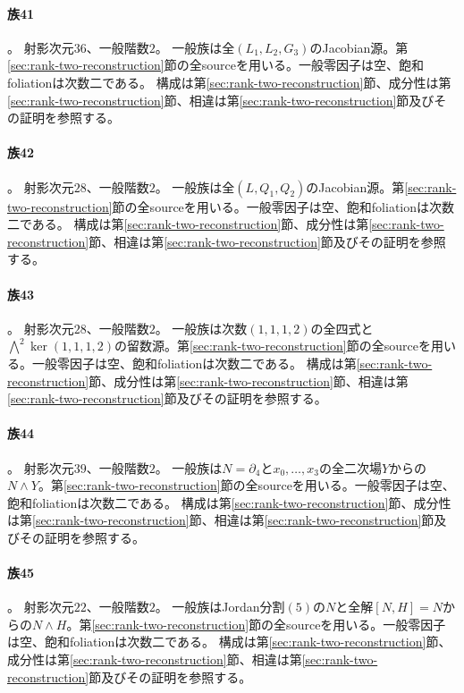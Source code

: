 \paragraph{族41}\label{catalogue:R2_RAT113}
。
射影次元$36$、一般階数$2$。
一般族は全$(L_1,L_2,G_3)$のJacobian源。第\ref{sec:rank-two-reconstruction}節の全sourceを用いる。一般零因子は空、飽和foliationは次数二である。
構成は第\ref{sec:rank-two-reconstruction}節、成分性は第\ref{sec:rank-two-reconstruction}節、相違は第\ref{sec:rank-two-reconstruction}節及びその証明を参照する。

\paragraph{族42}\label{catalogue:R2_RAT122}
。
射影次元$28$、一般階数$2$。
一般族は全$(L,Q_1,Q_2)$のJacobian源。第\ref{sec:rank-two-reconstruction}節の全sourceを用いる。一般零因子は空、飽和foliationは次数二である。
構成は第\ref{sec:rank-two-reconstruction}節、成分性は第\ref{sec:rank-two-reconstruction}節、相違は第\ref{sec:rank-two-reconstruction}節及びその証明を参照する。

\paragraph{族43}\label{catalogue:R2_LOG1112}
。
射影次元$28$、一般階数$2$。
一般族は次数$(1,1,1,2)$の全四式と$\bigwedge^2\ker(1,1,1,2)$の留数源。第\ref{sec:rank-two-reconstruction}節の全sourceを用いる。一般零因子は空、飽和foliationは次数二である。
構成は第\ref{sec:rank-two-reconstruction}節、成分性は第\ref{sec:rank-two-reconstruction}節、相違は第\ref{sec:rank-two-reconstruction}節及びその証明を参照する。

\paragraph{族44}\label{catalogue:R2_LPB}
。
射影次元$39$、一般階数$2$。
一般族は$N=\partial_4$と$x_0,\ldots,x_3$の全二次場$Y$からの$N\wedge Y$。第\ref{sec:rank-two-reconstruction}節の全sourceを用いる。一般零因子は空、飽和foliationは次数二である。
構成は第\ref{sec:rank-two-reconstruction}節、成分性は第\ref{sec:rank-two-reconstruction}節、相違は第\ref{sec:rank-two-reconstruction}節及びその証明を参照する。

\paragraph{族45}\label{catalogue:R2_AFF5}
。
射影次元$22$、一般階数$2$。
一般族はJordan分割$(5)$の$N$と全解$[N,H]=N$からの$N\wedge H$。第\ref{sec:rank-two-reconstruction}節の全sourceを用いる。一般零因子は空、飽和foliationは次数二である。
構成は第\ref{sec:rank-two-reconstruction}節、成分性は第\ref{sec:rank-two-reconstruction}節、相違は第\ref{sec:rank-two-reconstruction}節及びその証明を参照する。

